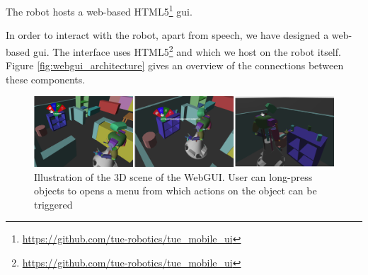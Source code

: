 \label{ssec:webgui}
The robot hosts a web-based HTML5\footnote{\url{https://github.com/tue-robotics/tue_mobile_ui}} \gls{gui}. 


In order to interact with the robot, apart from speech, we have designed a web-based \gls{gui}. The interface uses HTML5\footnote{\url{https://github.com/tue-robotics/tue_mobile_ui}} and which we host on the robot itself.
Figure \ref{fig:webgui_architecture} gives an overview of the connections between these components.

\begin{figure}[H]
	\includegraphics[width=\linewidth]{Figures/gui_actions}
	\caption{
		Illustration of the 3D scene of the WebGUI.
		User can long-press objects to opens a menu from which actions on the object can be triggered
		}
	\label{fig:gui_actions}
\end{figure}
